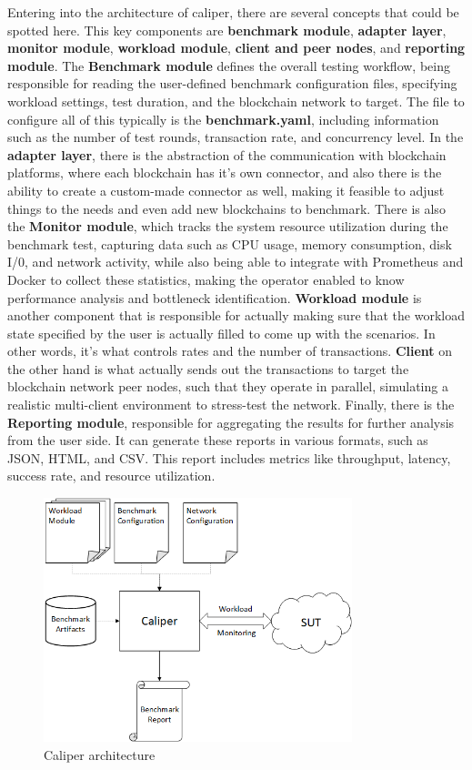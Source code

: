Entering into the architecture of caliper, there are several concepts that could be spotted here. This key components are \textbf{benchmark module}, \textbf{adapter layer}, \textbf{monitor module}, \textbf{workload module}, \textbf{client and peer nodes}, and \textbf{reporting module}. The \textbf{Benchmark module} defines the overall testing workflow, being responsible for reading the user-defined benchmark configuration files, specifying workload settings, test duration, and the blockchain network to target. The file to configure all of this typically is the \textbf{benchmark.yaml}, including information such as the number of test rounds, transaction rate, and concurrency level. In the \textbf{adapter layer}, there is the abstraction of the communication with blockchain platforms, where each blockchain has it's own connector, and also there is the ability to create a custom-made connector as well, making it feasible to adjust things to the needs and even add new blockchains to benchmark. There is also the \textbf{Monitor module}, which tracks the system resource utilization during the benchmark test, capturing data such as CPU usage, memory consumption, disk I/0, and network activity, while also being able to integrate with Prometheus and Docker to collect these statistics, making the operator enabled to know performance analysis and bottleneck identification. \textbf{Workload module} is another component that is responsible for actually making sure that the workload state specified by the user is actually filled to come up with the scenarios. In other words, it's what controls rates and the number of transactions. \textbf{Client} on the other hand is what actually sends out the transactions to target the blockchain network peer nodes, such that they operate in parallel, simulating a realistic multi-client environment to stress-test the network. Finally, there is the \textbf{Reporting module}, responsible for aggregating the results for further analysis from the user side. It can generate these reports in various formats, such as JSON, HTML, and CSV. This report includes metrics like throughput, latency, success rate, and resource utilization.

\begin{figure}[H]
    \centering
    \includegraphics[width=0.8\textwidth]{assets/tools/caliper/arch_high_level.png} %
    \caption{Caliper architecture}
    \label{fig:sample-image} 
\end{figure}

